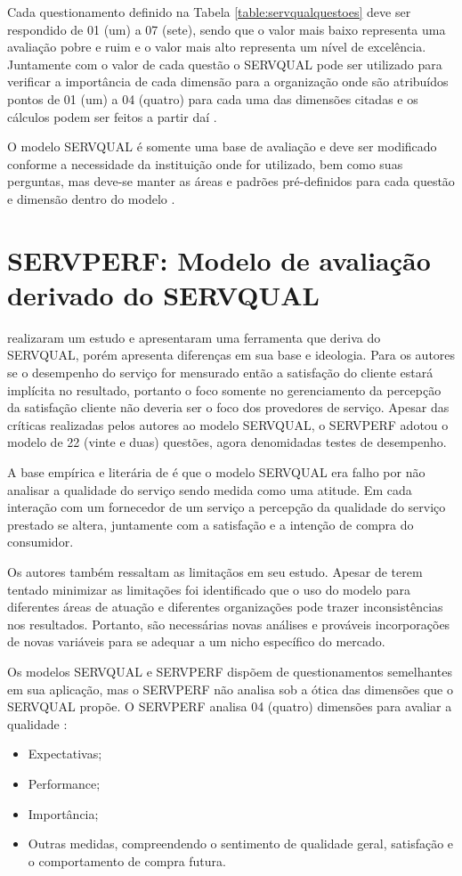 Cada questionamento definido na Tabela \ref{table:servqualquestoes} deve ser respondido de 01 (um) a 07 (sete), sendo que o valor mais baixo representa uma avaliação pobre e ruim e o valor mais alto representa um nível de excelência. Juntamente com o valor de cada questão o SERVQUAL pode ser utilizado para verificar a importância de cada dimensão para a organização onde são atribuídos pontos de 01 (um) a 04 (quatro) para cada uma das dimensões citadas e os cálculos podem ser feitos a partir daí \cite[p.~31]{parasuraman1988}.

O modelo SERVQUAL é somente uma base de avaliação e deve ser modificado conforme a necessidade da instituição onde for utilizado, bem como suas perguntas, mas deve-se manter as áreas e padrões pré-definidos para cada questão e dimensão dentro do modelo \cite[p.~9]{parasuraman1991}. 


\section{SERVPERF: Modelo de avaliação derivado do SERVQUAL}
\cite{cronintaylor1992} realizaram um estudo e apresentaram uma ferramenta que deriva do SERVQUAL, porém apresenta diferenças em sua base e ideologia. Para os autores se o desempenho do serviço for mensurado então a satisfação do cliente estará implícita no resultado, portanto o foco somente no gerenciamento da percepção da satisfação cliente não deveria ser o foco dos provedores de serviço. Apesar das críticas realizadas pelos autores ao modelo SERVQUAL, o SERVPERF adotou o modelo de 22 (vinte e duas) questões, agora denomidadas testes de desempenho.

A base empírica e literária de \cite{cronintaylor1992} é que o modelo SERVQUAL era falho por não analisar a qualidade do serviço sendo medida como uma atitude. Em cada interação com um fornecedor de um serviço a percepção da qualidade do serviço prestado se altera, juntamente com a satisfação e a intenção de compra do consumidor. 

Os autores também ressaltam as limitaçãos em seu estudo. Apesar de terem tentado minimizar as limitações foi identificado que o uso do modelo para diferentes áreas de atuação e diferentes organizações pode trazer inconsistências nos resultados. Portanto, são necessárias novas análises e prováveis incorporações de novas variáveis para se adequar a um nicho específico do mercado.

Os modelos SERVQUAL e SERVPERF dispõem de questionamentos semelhantes em sua aplicação, mas o SERVPERF não analisa sob a ótica das dimensões que o SERVQUAL propõe. O SERVPERF analisa 04 (quatro) dimensões para avaliar a qualidade \cite[p.~65-67]{cronintaylor1992}:
\begin{itemize}
	\item Expectativas;
	\item Performance;
	\item Importância;
	\item Outras medidas, compreendendo o sentimento de qualidade geral, satisfação e o comportamento de compra futura.
\end{itemize} 

